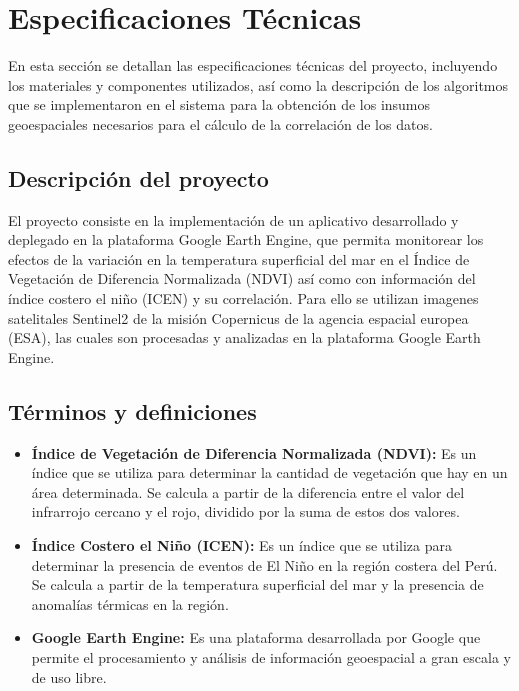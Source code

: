 \section{Especificaciones Técnicas }

  En esta sección se detallan las especificaciones técnicas del proyecto, incluyendo los materiales y componentes utilizados, así como la descripción de los algoritmos que se implementaron en el sistema para la obtención de los insumos geoespaciales necesarios para el cálculo de la correlación de los datos.

  \subsection{Descripción del proyecto}

    El proyecto consiste en la implementación de un aplicativo desarrollado y deplegado en la plataforma Google Earth Engine, que permita monitorear los efectos de la variación en la temperatura superficial del mar en el Índice de Vegetación de Diferencia Normalizada (NDVI) así como con información del índice costero el niño (ICEN) y su correlación. Para ello se utilizan imagenes satelitales Sentinel2 de la misión Copernicus de la agencia espacial europea (ESA), las cuales son procesadas y analizadas en la plataforma Google Earth Engine.

  \subsection{Términos y definiciones}

    \begin{itemize}
      \item \textbf{Índice de Vegetación de Diferencia Normalizada (NDVI):} Es un índice que se utiliza para determinar la cantidad de vegetación que hay en un área determinada. Se calcula a partir de la diferencia entre el valor del infrarrojo cercano y el rojo, dividido por la suma de estos dos valores.
      \item \textbf{Índice Costero el Niño (ICEN):} Es un índice que se utiliza para determinar la presencia de eventos de El Niño en la región costera del Perú. Se calcula a partir de la temperatura superficial del mar y la presencia de anomalías térmicas en la región.
      \item \textbf{Google Earth Engine:} Es una plataforma desarrollada por Google que permite el procesamiento y análisis de información geoespacial a gran escala y de uso libre.
    \end{itemize}

